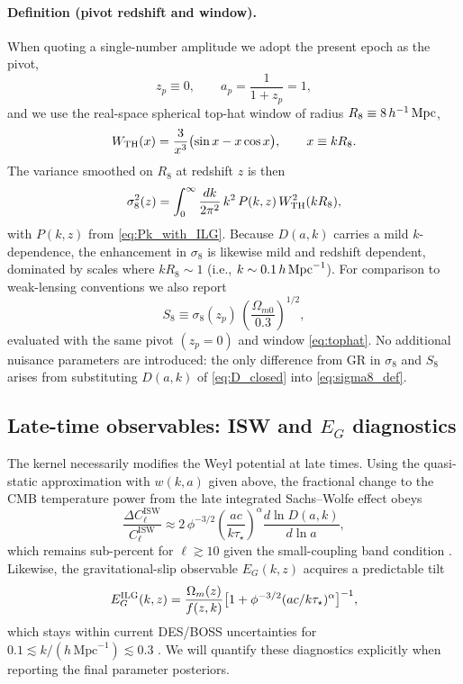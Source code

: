 \documentclass[11pt]{article}
\begin{document}
\paragraph*{Definition (pivot redshift and window).}
When quoting a single-number amplitude we adopt the present epoch as the pivot,
\begin{equation}
z_p \equiv 0,
\qquad
a_p = \frac{1}{1+z_p} = 1,
\end{equation}
and we use the real-space spherical top-hat window of radius $R_8\equiv 8\,h^{-1}\,{\rm Mpc}$,
\begin{equation}
W_{\rm TH}(x) = \frac{3}{x^3}\bigl(\sin x - x\cos x\bigr),
\qquad x\equiv kR_8.
\label{eq:tophat}
\end{equation}
The variance smoothed on $R_8$ at redshift $z$ is then
\begin{equation}
\sigma_8^2(z) = \int_{0}^{\infty}\frac{dk}{2\pi^2}\,k^2\,P(k,z)\,W_{\rm TH}^2(kR_8),
\label{eq:sigma8_def}
\end{equation}
with $P(k,z)$ from \eqref{eq:Pk_with_ILG}. Because $D(a,k)$ carries a mild $k$-dependence, the enhancement in $\sigma_8$ is likewise mild and redshift dependent, dominated by scales where $kR_8\sim 1$ (i.e., $k\sim 0.1\,h\,{\rm Mpc}^{-1}$). For comparison to weak-lensing conventions we also report
\begin{equation}
S_8 \equiv \sigma_8(z_p)\,\left(\frac{\Omega_{m0}}{0.3}\right)^{1/2},
\end{equation}
evaluated with the same pivot $(z_p=0)$ and window \eqref{eq:tophat}. No additional nuisance parameters are introduced: the only difference from GR in $\sigma_8$ and $S_8$ arises from substituting $D(a,k)$ of \eqref{eq:D_closed} into \eqref{eq:sigma8_def}.

\subsection{Late-time observables: ISW and \texorpdfstring{$E_G$}{E_G} diagnostics}
The kernel necessarily modifies the Weyl potential at late times. Using the quasi-static approximation with $w(k,a)$ given above, the fractional change to the CMB temperature power from the late integrated Sachs--Wolfe effect obeys
\begin{equation}
\frac{\Delta C_\ell^{\mathrm{ISW}}}{C_\ell^{\mathrm{ISW}}} \approx 2\,\phi^{-3/2}\left(\frac{a c}{k \tau_\star}\right)^{\alpha} \frac{d\ln D(a,k)}{d\ln a},
\end{equation}
which remains sub-percent for $\ell\gtrsim 10$ given the small-coupling band condition \citep[e.g.,][]{Planck2018ISW,DESY3EG}.
Likewise, the gravitational-slip observable $E_G(k,z)$ acquires a predictable tilt
\begin{equation}
E_G^{\rm ILG}(k,z) = \frac{\Omega_m(z)}{f(z,k)}\bigl[1+\phi^{-3/2}(a c/k \tau_\star)^{\alpha}\bigr]^{-1},
\end{equation}
which stays within current DES/BOSS uncertainties for $0.1\lesssim k/(h\,\mathrm{Mpc}^{-1})\lesssim 0.3$ \citep{DESY3EG}. We will quantify these diagnostics explicitly when reporting the final parameter posteriors.
\end{document}
